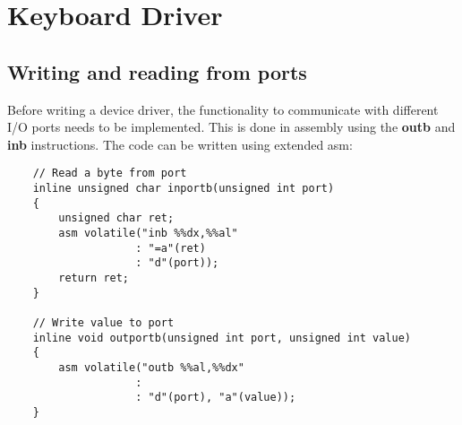 \chapter{Keyboard Driver}\label{chapter:Keyboard Driver}

\section{Writing and reading from ports}\label{section:Writing and reading from ports}

Before writing a device driver, the functionality to communicate with different I/O ports needs to be implemented.
This is done in assembly using the \textbf{outb} and \textbf{inb} instructions.
The code can be written using extended asm:

\begin{lstlisting}
    // Read a byte from port
    inline unsigned char inportb(unsigned int port)
    {
        unsigned char ret;
        asm volatile("inb %%dx,%%al"
                    : "=a"(ret)
                    : "d"(port));
        return ret;
    }

    // Write value to port
    inline void outportb(unsigned int port, unsigned int value)
    {
        asm volatile("outb %%al,%%dx"
                    :
                    : "d"(port), "a"(value));
    }
\end{lstlisting}

